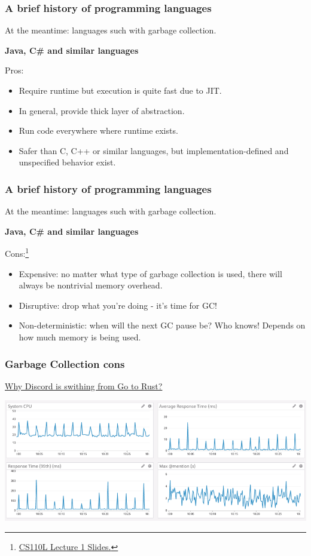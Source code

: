 \documentclass[aspectratio=1610,t]{beamer}
\begin{document}

\begin{frame}
\frametitle{A brief history of programming languages}
At the meantime: languages such with garbage collection.

\textbf{Java, C\# and similar languages}

Pros:
\begin{itemize}
    \item Require runtime but execution is quite fast due to JIT.
    \item In general, provide thick layer of abstraction.
    \item Run code everywhere where runtime exists.
    \item Safer than C, C++ or similar languages, but implementation-defined and unspecified behavior exist.
\end{itemize}
\end{frame}


\begin{frame}
\frametitle{A brief history of programming languages}
At the meantime: languages such with garbage collection.

\textbf{Java, C\# and similar languages}

Cons:\footnote{\href{https://reberhardt.com/cs110l/spring-2020/slides/lecture-01.pdf}{CS110L Lecture 1 Slides.}}
\begin{itemize}
    \item Expensive: no matter what type of garbage collection is used, there will always be nontrivial memory overhead.
    \item Disruptive: drop what you’re doing - it’s time for GC!
    \item Non-deterministic: when will the next GC pause be? Who knows! Depends on how much memory is being used.
\end{itemize}
\end{frame}


\begin{frame}
\frametitle{Garbage Collection cons}
\href{https://discord.com/blog/why-discord-is-switching-from-go-to-rust}{Why Discord is swithing from Go to Rust?}

\includegraphics[width=\textwidth,height=\textheight,keepaspectratio]{images/discord-spikes.png}

\end{frame}
\end{document}
